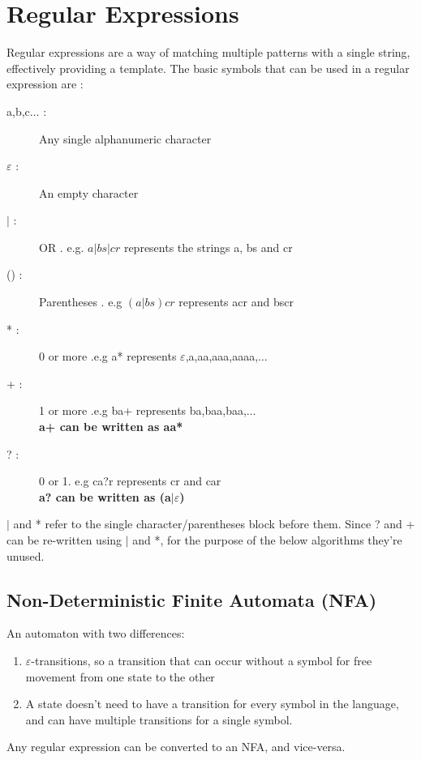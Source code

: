 \section{Regular Expressions}
Regular expressions are a way of matching multiple patterns with a single string, effectively providing a template. The basic symbols that can be used in a regular expression are :
\begin{description}
    \item [a,b,c$\dots$ :] Any single alphanumeric character
    \item [$\varepsilon$ :] An empty character
    \item [$|$ :] OR . e.g. $a|bs|cr$ represents the strings a, bs and cr
    \item [() :] Parentheses . e.g $(a|bs)cr$ represents acr and bscr
    \item [* :] 0 or more .e.g a* represents $\varepsilon$,a,aa,aaa,aaaa,$\dots$
    \item [+ :] 1 or more .e.g ba+ represents ba,baa,baa,$\dots$ \\
    \quad \textbf{a+ can be written as aa*}
    \item [? :] 0 or 1. e.g ca?r represents cr and car \\
    \quad \textbf{a? can be written as (a$|\varepsilon$)}
\end{description}
$|$ and * refer to the single character/parentheses block before them. Since ? and + can be re-written using $|$ and *, for the purpose of the below algorithms they're unused.

\subsection{Non-Deterministic Finite Automata (NFA)}
An automaton with two differences:
\begin{enumerate}
    \item $\varepsilon$-transitions, so a transition that can occur without a symbol for free movement from one state to the other
    \item A state doesn't need to have a transition for every symbol in the language, and can have multiple transitions for a single symbol.
\end{enumerate}
Any regular expression can be converted to an NFA, and vice-versa.

\newpage
